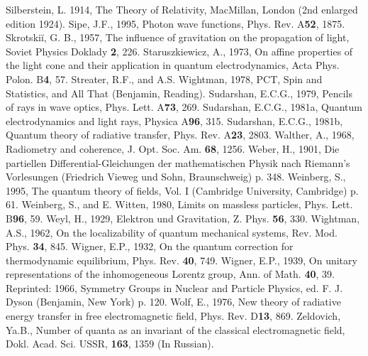 \documentclass{article}
\begin{document}
\begin{thebibliography}{References}
 Silberstein, L. 1914, The
Theory of Relativity, MacMillan, London (2nd enlarged edition 1924).
 Sipe, J.F., 1995, Photon wave functions,
Phys. Rev. A{\bf 52}, 1875.
 Skrotski\u i, G. B., 1957, The
influence of gravitation on the propagation of light, Soviet Physics Doklady
{\bf 2}, 226.
 Staruszkiewicz, A.,
1973, On affine properties of the light cone and their application in
quantum electrodynamics, Acta Phys. Polon. B{\bf 4}, 57.
 Streater, R.F., and A.S.
Wightman, 1978, PCT, Spin and Statistics, and All That (Benjamin, Reading).
 Sudarshan, E.C.G., 1979,
Pencils of rays in wave optics, Phys. Lett. A{\bf 73}, 269.
 Sudarshan, E.C.G., 1981a,
Quantum electrodynamics and light rays, Physica A{\bf 96}, 315.
 Sudarshan, E.C.G., 1981b,
Quantum theory of radiative transfer, Phys. Rev. A{\bf 23}, 2803.
 Walther, A., 1968, Radiometry and
coherence, J. Opt. Soc. Am. {\bf 68}, 1256.
 Weber, H., 1901, Die partiellen
Differential-Gleichungen der mathematischen Physik nach Riemann's
Vorlesungen (Friedrich Vieweg und Sohn, Braunschweig) p. 348.
 Weinberg, S., 1995, The quantum
theory of fields,  Vol. I (Cambridge University, Cambridge) p. 61.
 Weinberg, S., and E. Witten,
1980, Limits on massless particles, Phys. Lett. B{\bf 96}, 59.
 Weyl, H., 1929, Elektron und Gravitation,
Z. Phys. {\bf 56}, 330.
 Wightman, A.S., 1962, On the
localizability of quantum mechanical systems, Rev. Mod. Phys. {\bf 34}, 845.
 Wigner, E.P., 1932, On the quantum
correction for thermodynamic equilibrium, Phys. Rev. {\bf 40}, 749.
 Wigner, E.P., 1939, On unitary
representations of the inhomogeneous Lorentz group, Ann. of Math. {\bf 40},
39. Reprinted: 1966, Symmetry Groups in Nuclear and Particle Physics, ed. F. J.
Dyson (Benjamin, New York) p. 120.
 Wolf, E., 1976, New theory of radiative
energy transfer in free electromagnetic field, Phys. Rev. D{\bf 13}, 869.
 Zeldovich, Ya.B., Number of
quanta as an invariant of the classical electromagnetic field, Dokl. Acad.
Sci. USSR, {\bf 163}, 1359 (In Russian).

\end{thebibliography}
\end{document}
